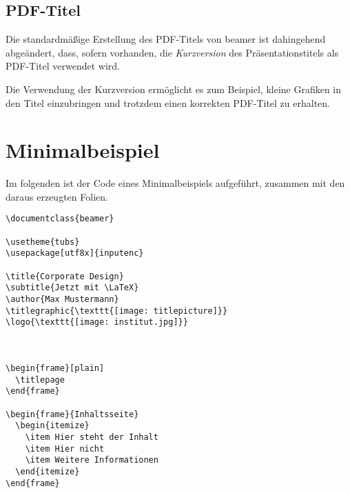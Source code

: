 \subsection{PDF-Titel}

Die standardmäßige Erstellung des PDF-Titels von beamer ist dahingehend
abgeändert, dass, sofern vorhanden, die \emph{Kurzversion} des Präsentationstitels
als PDF-Titel verwendet wird.

Die Verwendung der Kurzversion ermöglicht es zum Beispiel,
kleine Grafiken in den Titel einzubringen und
trotzdem einen korrekten PDF-Titel zu erhalten.


\section{Minimalbeispiel}%

Im folgenden ist der Code eines Minimalbeispiels aufgeführt, zusammen mit den
daraus erzeugten Folien.

\begin{verbatim}
\documentclass{beamer}

\usetheme{tubs}
\usepackage[utf8x]{inputenc}

\title{Corporate Design}
\subtitle{Jetzt mit \LaTeX}
\author{Max Mustermann}
\titlegraphic{\texttt{[image: titlepicture]}}
\logo{\texttt{[image: institut.jpg]}}



\begin{frame}[plain]
  \titlepage
\end{frame}

\begin{frame}{Inhaltsseite}
  \begin{itemize}
    \item Hier steht der Inhalt
    \item Hier nicht
    \item Weitere Informationen
  \end{itemize}
\end{frame}


\end{verbatim}

\begin{center}

\end{center}
